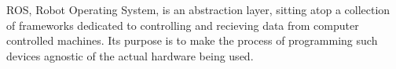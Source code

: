 
ROS, Robot Operating System, is an abstraction layer, sitting atop a collection of frameworks dedicated to controlling and recieving data from computer controlled machines. Its purpose is to make the process of programming such devices agnostic of the actual hardware being used.
